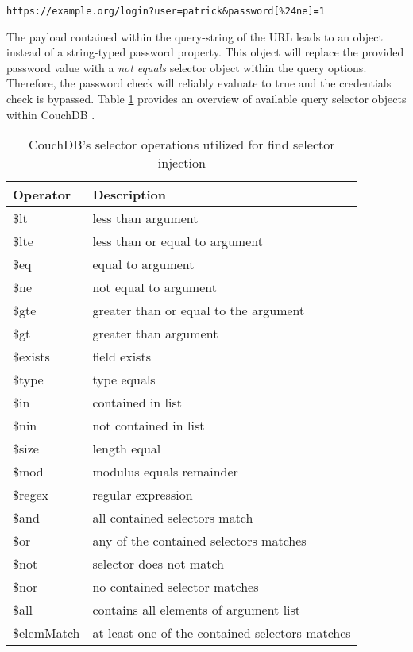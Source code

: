 \begin{lstlisting}[caption={Attack vector against CouchDB for speical key injection via the query-string parameter}, label={lst:FindSelectorInjectionAttack}]
https://example.org/login?user=patrick&password[%24ne]=1
\end{lstlisting}

The payload contained within the query-string of the URL leads to an object instead of a string-typed password property. This object will replace the provided password value with a \emph{not equals} selector object within the query options. Therefore, the password check will reliably evaluate to true and the credentials check is bypassed. Table \ref{tab:couchdb_affected_selectors} provides an overview of available query selector objects within CouchDB \cite{ASF2016a}. \\

\begin{table}[h]
 \sffamily
 \centering
 \begin{tabular}{ll}
  \textbf{Operator} & \textbf{Description} \\ \hline
  \$lt      & less than argument\\
  \$lte     & less than or equal to argument \\
  \$eq      & equal to argument \\
  \$ne      & not equal to argument \\
  \$gte     & greater than or equal to the argument \\
  \$gt      & greater than argument \\
  \$exists  & field exists \\
  \$type    & type equals \\
  \$in      & contained in list \\
  \$nin     & not contained in list \\
  \$size    & length equal \\
  \$mod     & modulus equals remainder \\
  \$regex   & regular expression \\
  \$and     & all contained selectors match \\
  \$or      & any of the contained selectors matches \\
  \$not     & selector does not match \\
  \$nor     & no contained selector matches \\
  \$all     & contains all elements of argument list \\ 
  \$elemMatch & at least one of the contained selectors matches \\
  \bottomrule 
 \end{tabular}
 \caption{CouchDB's selector operations utilized for find selector injection}
 \label{tab:couchdb_affected_selectors}
\end{table}


